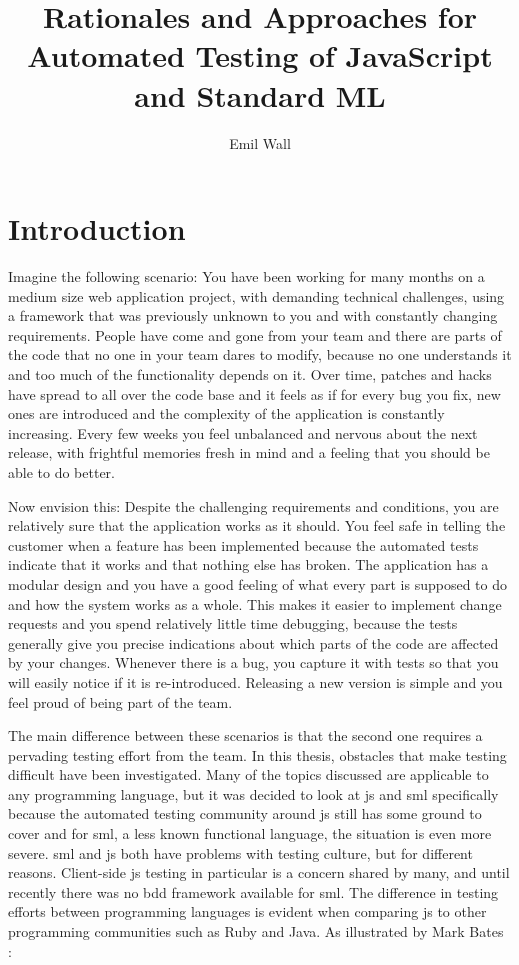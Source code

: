 \documentclass[11pt]{article}
\title{Rationales and Approaches for Automated Testing of JavaScript and Standard ML}
\author{Emil Wall}
\begin{document}


\printglossaries

\newpage

\section{Introduction}

Imagine the following scenario: You have been working for many months on a medium size web application project, with demanding technical challenges, using a framework that was previously unknown to you and with constantly changing requirements. People have come and gone from your team and there are parts of the code that no one in your team dares to modify, because no one understands it and too much of the functionality depends on it. Over time, patches and hacks have spread to all over the code base and it feels as if for every bug you fix, new ones are introduced and the complexity of the application is constantly increasing. Every few weeks you feel unbalanced and nervous about the next release, with frightful memories fresh in mind and a feeling that you should be able to do better.

Now envision this: Despite the challenging requirements and conditions, you are relatively sure that the application works as it should. You feel safe in telling the customer when a feature has been implemented because the automated tests indicate that it works and that nothing else has broken. The application has a modular design and you have a good feeling of what every part is supposed to do and how the system works as a whole. This makes it easier to implement change requests and you spend relatively little time debugging, because the tests generally give you precise indications about which parts of the code are affected by your changes. Whenever there is a bug, you capture it with tests so that you will easily notice if it is re-introduced. Releasing a new version is simple and you feel proud of being part of the team.

The main difference between these scenarios is that the second one requires a pervading \gls{testing} effort from the team. In this thesis, obstacles that make \gls{testing} difficult have been investigated. Many of the topics discussed are applicable to any programming language, but it was decided to look at \gls{js} and \gls{sml} specifically because the automated testing community around \gls{js} still has some ground to cover \cite[p.~xix]{Tddjs} and for \gls{sml}, a less known functional language, the situation is even more severe.
\Gls{sml} and \gls{js} both have problems with testing culture, but for different reasons. Client-side \gls{js} testing in particular is a concern shared by many, and until recently there was no \gls{bdd} framework available for \gls{sml}.
The difference in testing efforts between programming languages is evident when comparing \gls{js} to other programming communities such as Ruby and Java. As illustrated by Mark Bates \cite{TestingStatistics}:
\end{document}
